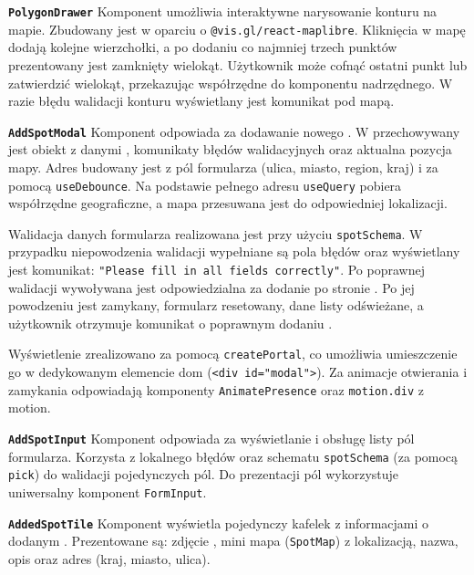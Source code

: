\textbf{\texttt{PolygonDrawer}}
Komponent umożliwia interaktywne narysowanie konturu  na mapie.
Zbudowany jest w oparciu o \texttt{@vis.gl/react-maplibre}.
Kliknięcia w mapę dodają kolejne wierzchołki, a po dodaniu co najmniej trzech punktów prezentowany jest zamknięty wielokąt.
Użytkownik może cofnąć ostatni punkt lub zatwierdzić wielokąt, przekazując współrzędne do komponentu nadrzędnego.
W razie błędu walidacji konturu wyświetlany jest komunikat pod mapą.

\textbf{\texttt{AddSpotModal}}
Komponent odpowiada za dodawanie nowego .
W  przechowywany jest obiekt z danymi , komunikaty błędów walidacyjnych oraz aktualna pozycja mapy.
Adres budowany jest z pól formularza (ulica, miasto, region, kraj) i  za pomocą
 \texttt{useDebounce}.
Na podstawie pełnego adresu  \texttt{useQuery} pobiera współrzędne geograficzne, a mapa przesuwana
jest do odpowiedniej lokalizacji.

Walidacja danych formularza realizowana jest przy użyciu \texttt{spotSchema}.
W przypadku niepowodzenia walidacji wypełniane są pola błędów oraz wyświetlany jest komunikat:
\texttt{"Please fill in all fields correctly"}.
Po poprawnej walidacji wywoływana jest  odpowiedzialna za dodanie  po stronie .
Po jej powodzeniu  jest zamykany, formularz resetowany, dane listy odświeżane, a użytkownik otrzymuje
komunikat o poprawnym dodaniu .

Wyświetlenie  zrealizowano za pomocą \texttt{createPortal}, co umożliwia umieszczenie go w dedykowanym elemencie
\gls{dom} (\texttt{<div id="modal">}).
Za animacje otwierania i zamykania odpowiadają komponenty \texttt{AnimatePresence} oraz
\texttt{motion.div} z  motion.

\textbf{\texttt{AddSpotInput}}
Komponent odpowiada za wyświetlanie i obsługę listy pól formularza.
Korzysta z lokalnego  błędów oraz schematu \texttt{spotSchema} (za pomocą \texttt{pick}) do walidacji pojedynczych pól.
Do prezentacji pól wykorzystuje uniwersalny komponent \texttt{FormInput}.

\textbf{\texttt{AddedSpotTile}}
Komponent wyświetla pojedynczy kafelek z informacjami o dodanym .
Prezentowane są: zdjęcie , mini mapa (\texttt{SpotMap}) z lokalizacją, nazwa, opis oraz adres (kraj, miasto, ulica).

